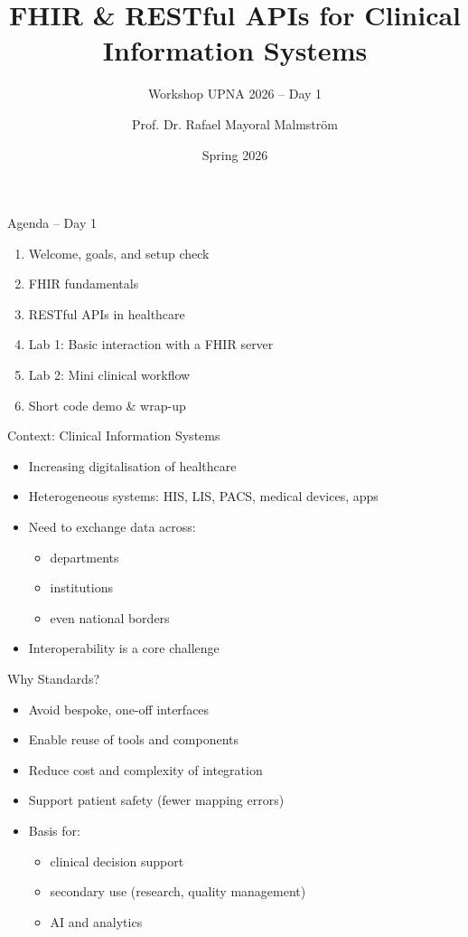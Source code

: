 \documentclass[aspectratio=1610]{beamer}
\title[FHIR \& REST Workshop]{FHIR \& RESTful APIs for Clinical Information Systems}
\subtitle{Workshop UPNA 2026 -- Day 1}
\author{Prof. Dr. Rafael Mayoral Malmström}
\institute[Kempten UAS]{Hochschule Kempten -- University of Applied Sciences}
\date{Spring 2026}
\begin{document}
	
	\begin{frame}
		\titlepage
	\end{frame}
	
	\begin{frame}{Agenda -- Day 1}
		\begin{enumerate}
			\item Welcome, goals, and setup check
			\item FHIR fundamentals
			\item RESTful APIs in healthcare
			\item Lab 1: Basic interaction with a FHIR server
			\item Lab 2: Mini clinical workflow
			\item Short code demo \& wrap-up
		\end{enumerate}
	\end{frame}
	
	\begin{frame}{Context: Clinical Information Systems}
		\begin{itemize}
			\item Increasing digitalisation of healthcare
			\item Heterogeneous systems: HIS, LIS, PACS, medical devices, apps
			\item Need to exchange data across:
			\begin{itemize}
				\item departments
				\item institutions
				\item even national borders
			\end{itemize}
			\item Interoperability is a \alert{core challenge}
		\end{itemize}
	\end{frame}
	
	\begin{frame}{Why Standards?}
		\begin{itemize}
			\item Avoid bespoke, one-off interfaces
			\item Enable reuse of tools and components
			\item Reduce cost and complexity of integration
			\item Support patient safety (fewer mapping errors)
			\item Basis for:
			\begin{itemize}
				\item clinical decision support
				\item secondary use (research, quality management)
				\item AI and analytics
			\end{itemize}
		\end{itemize}
	\end{frame}
	
\end{document}
